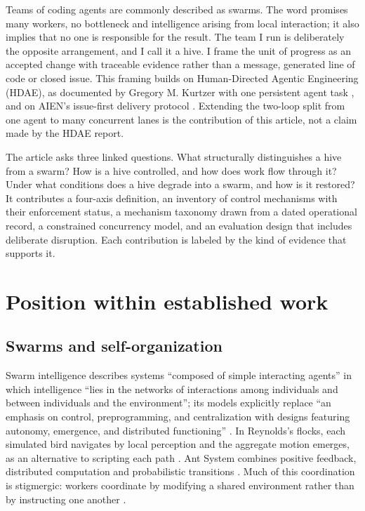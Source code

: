 \documentclass[11pt]{article}
\begin{document}
Teams of coding agents are commonly described as swarms. The word promises many workers, no bottleneck and intelligence arising from local interaction; it also implies that no one is responsible for the result. The team I run is deliberately the opposite arrangement, and I call it a hive. I frame the unit of progress as an accepted change with traceable evidence rather than a message, generated line of code or closed issue. This framing builds on Human-Directed Agentic Engineering (HDAE), as documented by Gregory M. Kurtzer with one persistent agent task \cite{kurtzer}, and on AIEN's issue-first delivery protocol \cite{issuefirst}. Extending the two-loop split from one agent to many concurrent lanes is the contribution of this article, not a claim made by the HDAE report.

The article asks three linked questions. What structurally distinguishes a hive from a swarm? How is a hive controlled, and how does work flow through it? Under what conditions does a hive degrade into a swarm, and how is it restored? It contributes a four-axis definition, an inventory of control mechanisms with their enforcement status, a mechanism taxonomy drawn from a dated operational record, a constrained concurrency model, and an evaluation design that includes deliberate disruption. Each contribution is labeled by the kind of evidence that supports it.

\section{Position within established work}

\subsection{Swarms and self-organization}

Swarm intelligence describes systems ``composed of simple interacting agents'' in which intelligence ``lies in the networks of interactions among individuals and between individuals and the environment''; its models explicitly replace ``an emphasis on control, preprogramming, and centralization with designs featuring autonomy, emergence, and distributed functioning'' \cite{bonabeau1999}. In Reynolds's flocks, each simulated bird navigates by local perception and the aggregate motion emerges, as an alternative to scripting each path \cite{reynolds1987}. Ant System combines positive feedback, distributed computation and probabilistic transitions \cite{dorigo1996}. Much of this coordination is stigmergic: workers coordinate by modifying a shared environment rather than by instructing one another \cite{grasse1959,theraulaz1999}.
\end{document}
